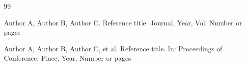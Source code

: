 \documentclass{article}
\begin{document}
	
	
	
%		
%		
%		
	\begin{thebibliography}{99}

         Author A, Author B, Author C. Reference title. Journal, Year, Vol: Number or pages
        
         Author A, Author B, Author C, et al. Reference title. In: Proceedings of Conference, Place, Year. Number or pages
        
        \end{thebibliography}

\end{document}
